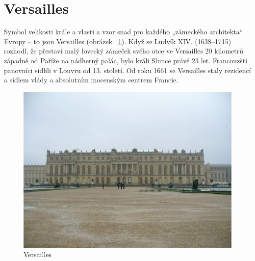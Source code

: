 
\section{Versailles}
Symbol velikosti krále a vlasti a vzor snad pro každého „zámeckého architekta“ Evropy – to jsou Versailles (obrázek ~\ref{ver1}). Když se Ludvík XIV. (1638–1715) rozhodl, že přestaví malý lovecký zámeček svého otce ve Versailles 20 kilometrů západně od Paříže na nádherný palác, bylo králi Slunce právě 23 let. Francouzští panovníci sídlili v Louvru od 13. století. Od roku 1661 se Versailles staly rezidencí a sídlem vlády a absolutním mocenským centrem Francie.\\\begin{figure}[h!]
\centering
\includegraphics[scale=0.5]{images/obr10V.jpg}
\caption{Versailles}
\label{ver1}

\end{figure}
